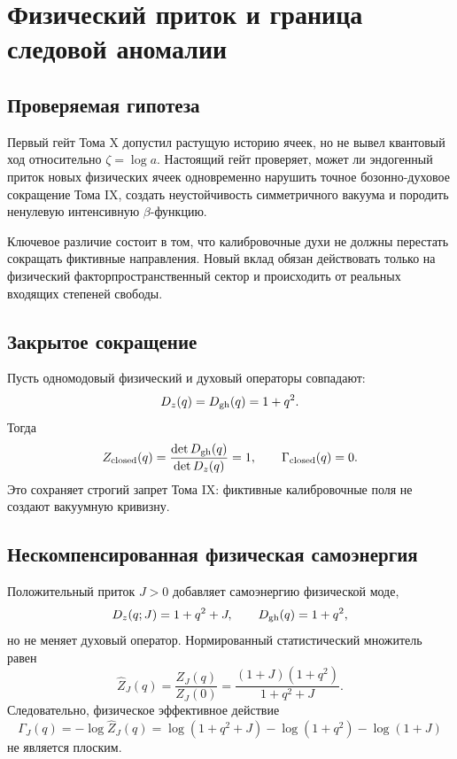 \chapter{Физический приток и граница следовой аномалии}
\label{ch:v10-geometric-scale-beta-trace-anomaly-origin}

\section{Проверяемая гипотеза}

Первый гейт Тома X допустил растущую историю ячеек, но не вывел квантовый
ход относительно $\zeta=\log a$. Настоящий гейт проверяет, может ли
эндогенный приток новых физических ячеек одновременно нарушить точное
бозонно-духовое сокращение Тома IX, создать неустойчивость симметричного
вакуума и породить ненулевую интенсивную $\beta$-функцию.

Ключевое различие состоит в том, что калибровочные духи не должны перестать
сокращать фиктивные направления. Новый вклад обязан действовать только на
физический факторпространственный сектор и происходить от реальных входящих
степеней свободы.

\section{Закрытое сокращение}

Пусть одномодовый физический и духовый операторы совпадают:
\begin{equation}
 D_z(q)=D_{\rm gh}(q)=1+q^2.
 \label{eq:v10-inflow-closed-operators}
\end{equation}
Тогда
\begin{equation}
 Z_{\rm closed}(q)
 =\frac{\det D_{\rm gh}(q)}{\det D_z(q)}=1,
 \qquad
 \Gamma_{\rm closed}(q)=0.
 \label{eq:v10-inflow-closed-cancellation}
\end{equation}
Это сохраняет строгий запрет Тома IX: фиктивные калибровочные поля не
создают вакуумную кривизну.

\section{Нескомпенсированная физическая самоэнергия}

Положительный приток $J>0$ добавляет самоэнергию физической моде,
\begin{equation}
 D_z(q;J)=1+q^2+J,
 \qquad
 D_{\rm gh}(q)=1+q^2,
 \label{eq:v10-inflow-shifted-operator}
\end{equation}
но не меняет духовый оператор. Нормированный статистический множитель равен
\begin{equation}
 \widehat Z_J(q)
 =\frac{Z_J(q)}{Z_J(0)}
 =\frac{(1+J)(1+q^2)}{1+q^2+J}.
 \label{eq:v10-inflow-normalized-partition}
\end{equation}
Следовательно, физическое эффективное действие
\begin{equation}
 \Gamma_J(q)
 =-\log\widehat Z_J(q)
 =\log(1+q^2+J)-\log(1+q^2)-\log(1+J)
 \label{eq:v10-inflow-effective-action}
\end{equation}
не является плоским.

